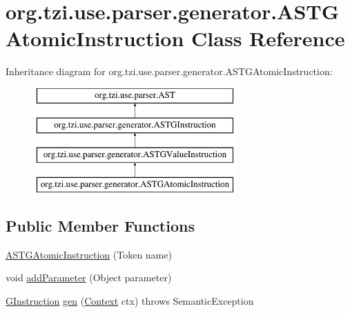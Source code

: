 \hypertarget{classorg_1_1tzi_1_1use_1_1parser_1_1generator_1_1_a_s_t_g_atomic_instruction}{\section{org.\-tzi.\-use.\-parser.\-generator.\-A\-S\-T\-G\-Atomic\-Instruction Class Reference}
\label{classorg_1_1tzi_1_1use_1_1parser_1_1generator_1_1_a_s_t_g_atomic_instruction}
}
Inheritance diagram for org.\-tzi.\-use.\-parser.\-generator.\-A\-S\-T\-G\-Atomic\-Instruction\-:\begin{figure}[H]
\begin{center}
\leavevmode
\includegraphics[height=4.000000cm]{classorg_1_1tzi_1_1use_1_1parser_1_1generator_1_1_a_s_t_g_atomic_instruction}
\end{center}
\end{figure}
\subsection*{Public Member Functions}
\begin{DoxyCompactItemize}
\item 
\hyperlink{classorg_1_1tzi_1_1use_1_1parser_1_1generator_1_1_a_s_t_g_atomic_instruction_a22974ec6f960e9c8fe2b488c78257e61}{A\-S\-T\-G\-Atomic\-Instruction} (Token name)
\item 
void \hyperlink{classorg_1_1tzi_1_1use_1_1parser_1_1generator_1_1_a_s_t_g_atomic_instruction_a1d98d8351b980f378d52d5ca1b0ef00b}{add\-Parameter} (Object parameter)
\item 
\hyperlink{interfaceorg_1_1tzi_1_1use_1_1gen_1_1assl_1_1statics_1_1_g_instruction}{G\-Instruction} \hyperlink{classorg_1_1tzi_1_1use_1_1parser_1_1generator_1_1_a_s_t_g_atomic_instruction_aa33be8c906ad49b58ac995a76f6fb972}{gen} (\hyperlink{classorg_1_1tzi_1_1use_1_1parser_1_1_context}{Context} ctx)  throws Semantic\-Exception 
\end{DoxyCompactItemize}


